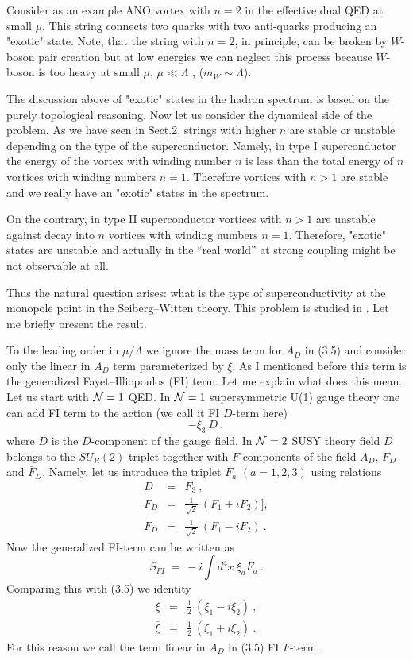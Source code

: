 \documentclass[a4paper,12pt]{article}
\begin{document}
Consider as an example  ANO vortex with $n=2$
in the effective dual QED at small $\mu$. This
 string connects two quarks with two anti-quarks producing
an "exotic" state.  Note, that the string with $n=2$, in principle,
can be broken by $W$-boson pair creation but at low energies
 we
can neglect this process because $W$-boson is too heavy
at small $\mu$, $\mu \ll\Lambda$ ,
($m_W\sim\Lambda$).

The discussion above of "exotic" states in the hadron spectrum
\cite{S} is based on the purely topological reasoning. Now let
us consider the dynamical side of the problem. As we have seen
in Sect.2, strings with higher $n$ are stable or unstable
depending on the type of the superconductor. Namely,  in type I
superconductor the energy of the vortex with winding number $n$
is less than the total energy of $n$ vortices  with winding
numbers $n=1$.  Therefore vortices  with $n>1$ are stable and we
really have an "exotic" states in the spectrum.

On the contrary, in type II superconductor vortices with $n>1$
are unstable against decay into $n$ vortices with winding
numbers $n=1$. Therefore, "exotic" states are unstable and
actually in the ``real world'' at strong coupling might be not
observable at all.

Thus the natural question arises: what is the type of
superconductivity at the monopole point in the Seiberg--Witten
theory. This problem is studied in \cite{VY}. Let me briefly
present the result.

To the leading order in $\mu /\Lambda$ we ignore the mass
term for $A_D$ in (3.5) and consider only the linear in $A_D$
term parameterized by $\xi$. As I mentioned before this term is
the generalized Fayet--Illiopoulos (FI) term.
Let me explain what does this mean.
Let us start with  ${\cal N}=1$ QED.
 In  ${\cal N}=1$ 
supersymmetric U(1) gauge  theory one can add FI term to the action
\cite{FI} (we call it FI $D$-term here)
\begin{equation}
-\xi_3\ D\ ,
\end{equation}
where $D$ is the $D$-component of the gauge field. In ${\cal N}=2$ SUSY
theory field $D$ belongs to the $SU_R(2)$ triplet together with
$F$-components of the field $A_D$, $F_D$ and $\bar F_D$. Namely,
let us introduce the triplet $F_a$ $(a=1,2,3)$ using relations
\begin{eqnarray}
D &=& F_3\ , \nonumber\\
F_D &=& \frac1{\sqrt2}\ (F_1+iF_2)] , \nonumber\\
\bar F_D &=& \frac1{\sqrt2}\ (F_1-iF_2)\ .
\end{eqnarray}
Now the generalized FI-term can be written as
\begin{equation}
S_{FI}\ =\ -i\int d^4x\ \xi_aF_a\ .
\end{equation}
Comparing this with (3.5) we identity
\begin{eqnarray}
\xi &=& \frac12\ (\xi_1-i\xi_2)\ , \nonumber\\
\bar\xi &=& \frac12\ (\xi_1+i\xi_2)\ .
\end{eqnarray}
For this reason  we call the term linear in $A_D$ in (3.5)
FI $F$-term.
\end{document}
